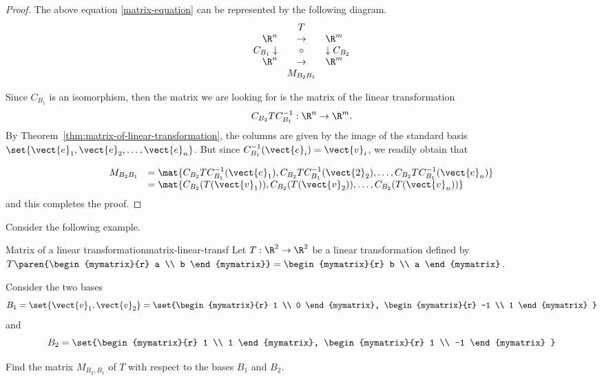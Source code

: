 \begin{proof}
The above equation {\eqref{matrix-equation}} can be represented by the following diagram.
\begin{equation*}
\begin{array}{rrcll}
&  & T &  &  \\
& \R^n & \rightarrow  & \R^m & \\
& C_{B_{1} }\downarrow  & \circ  & \downarrow C_{B_{2} } &  \\
& \R^{n} & \rightarrow  & \R^{m} &  \\
&  & M_{B_{2} B_{1} } &  &
\end{array}
\end{equation*}

Since $C_{B_1}$ is an isomorphism, then the matrix we are looking for is the matrix of the linear transformation
\[   C_{B_2} T C^{-1}_{B_1} : \R^n \to \R^m. \]
By Theorem~\ref{thm:matrix-of-linear-transformation}, the columns are
given by the image of the standard basis $\set{\vect{e}_1,
\vect{e}_2,\ldots, \vect{e}_n }$. But since $C^{-1}_{B_1}( \vect{e}_i) = \vect{v}_i$, we readily obtain that

\[ \begin{array}{ll}
M_{B_{2} B_{1}}
& = \mat{C_{B_2}T C^{-1}_{B_1} (\vect{e}_1), C_{B_2}T C^{-1}_{B_1} (\vect{2}_2), \ldots, C_{B_2}T C^{-1}_{B_1} (\vect{e}_n) } \\
& = \mat{C_{B_2}(T(\vect{v}_1)), C_{B_2}(T(\vect{v}_2)), \ldots, C_{B_2}(T(\vect{v}_n)) }
\end{array}\]
and this completes the proof.
\end{proof}

Consider the following example.

\begin{example}{Matrix of a linear transformation}{matrix-linear-transf}
Let $T: \R^2 \to \R^2$ be a linear transformation defined by $T \paren{\begin{mymatrix}{r}
a \\
b
\end{mymatrix}} = \begin{mymatrix}{r}
b \\
a
\end{mymatrix}$.

Consider the two bases
\[
B_1 = \set{\vect{v}_{1}, \vect{v}_{2} } = \set{\begin{mymatrix}{r}
1 \\
0
\end{mymatrix}, \begin{mymatrix}{r}
-1 \\
1
\end{mymatrix}
}
\]
 and
\[
B_2 = \set{\begin{mymatrix}{r}
1 \\
1
\end{mymatrix}, \begin{mymatrix}{r}
1 \\
-1
\end{mymatrix}
}
\]

Find the matrix $M_{B_2,B_1}$ of $T$ with respect to the bases $B_1$ and $B_2$.
\end{example}

